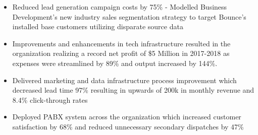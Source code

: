 \documentclass[10pt,a4paper,ragged2e]{altacv}
\begin{document}

\begin{fullwidth}
\makecvheader
\end{fullwidth}



\begin{itemize}
\item Reduced lead generation campaign costs by 75\% - Modelled Business Development's new industry sales segmentation strategy to target Bounce's installed base customers utilizing disparate source data
\item Improvements and enhancements in tech infrastructure resulted in the organization realizing a record net profit of \$5 Million in 2017-2018 as expenses were streamlined by 89\% and output increased by 144\%.
\item Delivered marketing and data infrastructure process improvement which decreased lead time 97\% resulting in upwards of 200k in monthly revenue and 8.4\% click-through rates 
\item Deployed PABX system across the organization which increased customer satisfaction by 68\% and reduced unnecessary secondary dispatches by 47\%
\end{itemize}
\end{document}
